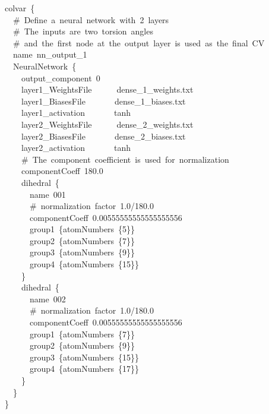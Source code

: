\begin{cvexampleinput}
\-colvar~\{\\
\-~~\#~Define~a~neural~network~with~2~layers\\
\-~~\#~The~inputs~are~two~torsion~angles\\
\-~~\#~and~the~first~node~at~the~output~layer~is~used~as~the~final~CV\\
\-~~name~nn\_output\_1\\
\-~~NeuralNetwork~\{\\
\-~~~~output\_component~0\\
\-~~~~layer1\_WeightsFile~~~~~~dense\_1\_weights.txt\\
\-~~~~layer1\_BiasesFile~~~~~~~dense\_1\_biases.txt\\
\-~~~~layer1\_activation~~~~~~~tanh\\
\-~~~~layer2\_WeightsFile~~~~~~dense\_2\_weights.txt\\
\-~~~~layer2\_BiasesFile~~~~~~~dense\_2\_biases.txt\\
\-~~~~layer2\_activation~~~~~~~tanh\\
\-~~~~\#~The~component~coefficient~is~used~for~normalization\\
\-~~~~componentCoeff~180.0\\
\-~~~~dihedral~\{\\
\-~~~~~~name~001\\
\-~~~~~~\#~normalization~factor~1.0/180.0\\
\-~~~~~~componentCoeff~0.00555555555555555556\\
\-~~~~~~group1~\{atomNumbers~\{5\}\}\\
\-~~~~~~group2~\{atomNumbers~\{7\}\}\\
\-~~~~~~group3~\{atomNumbers~\{9\}\}\\
\-~~~~~~group4~\{atomNumbers~\{15\}\}\\
\-~~~~\}\\
\-~~~~dihedral~\{\\
\-~~~~~~name~002\\
\-~~~~~~\#~normalization~factor~1.0/180.0\\
\-~~~~~~componentCoeff~0.00555555555555555556\\
\-~~~~~~group1~\{atomNumbers~\{7\}\}\\
\-~~~~~~group2~\{atomNumbers~\{9\}\}\\
\-~~~~~~group3~\{atomNumbers~\{15\}\}\\
\-~~~~~~group4~\{atomNumbers~\{17\}\}\\
\-~~~~\}\\
\-~~\}\\
\-\}\\
\end{cvexampleinput}



